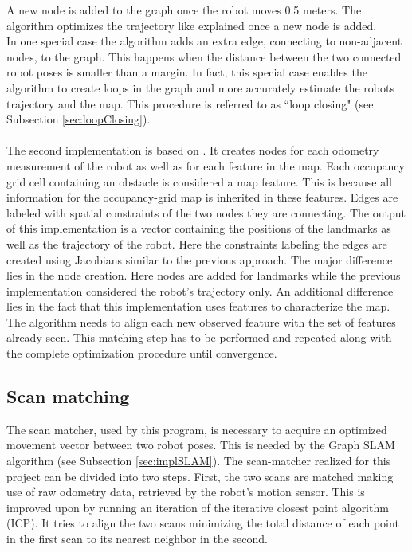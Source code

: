 \documentclass{ba-kecs}
\begin{document}
A new node is added to the graph once the robot moves 0.5 meters. The algorithm optimizes the trajectory like explained once a new node is added.\\
In one special case the algorithm adds an extra edge, connecting to non-adjacent nodes, to the graph. This happens when the distance between the two connected robot poses is smaller than a margin. In fact, this special case enables the algorithm to create loops in the graph and more accurately estimate the robots trajectory and the map. This procedure is referred to as ``loop closing" (see Subsection \ref{sec:loopClosing}). 
\\
\\
The second implementation is based on \cite{Thrun}. It creates nodes for each odometry measurement of the robot as well as for each feature in the map. Each occupancy grid cell containing an obstacle is considered a map feature. This is because all information for the occupancy-grid map is inherited in these features. Edges are labeled with spatial constraints of the two nodes they are connecting. The output of this implementation is a vector containing the positions of the landmarks as well as the trajectory of the robot. Here the constraints labeling the edges are created using Jacobians similar to the previous approach. The major difference lies in the node creation. Here nodes are added for landmarks while the previous implementation considered the robot's trajectory only. An additional difference lies in the fact that this implementation uses features to characterize the map. The algorithm needs to align each new observed feature with the set of features already seen. This matching step has to be performed and repeated along with the complete optimization procedure until convergence.

\subsection{Scan matching}
\label{sec:scan}
The scan matcher, used by this program, is necessary to acquire an optimized movement vector between two robot poses. This is needed by the Graph SLAM algorithm (see Subsection \ref{sec:implSLAM}). The scan-matcher realized for this project can be divided into two steps. First, the two scans are matched making use of raw odometry data, retrieved by the robot's motion sensor. This is improved upon by running an iteration of the iterative closest point algorithm (ICP). It tries to align the two scans minimizing the total distance of each point in the first scan to its nearest neighbor in the second. 
\end{document}
